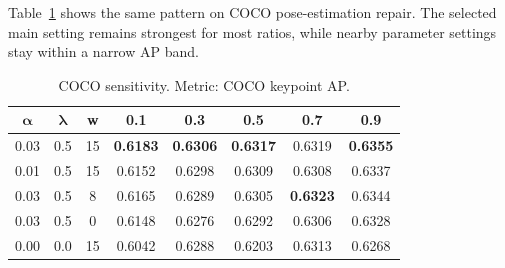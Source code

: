Table~\ref{tab:coco-rpc-sensitivity} shows the same pattern on COCO pose-estimation repair. The selected main setting remains strongest for most ratios, while nearby \model parameter settings stay within a narrow AP band.

\begin{table}[t]
\centering
\caption{COCO \model sensitivity. Metric: COCO keypoint AP.}
\label{tab:coco-rpc-sensitivity}
\small
\setlength{\tabcolsep}{4pt}
\begin{tabular}{c c c c c c c c}
\toprule
\rowcolor{sectiongray} $\boldsymbol{\alpha}$ & $\boldsymbol{\lambda}$ & \textbf{w} & \textbf{0.1} & \textbf{0.3} & \textbf{0.5} & \textbf{0.7} & \textbf{0.9} \\
\midrule
0.03 & 0.5 & 15 & \textbf{0.6183} & \textbf{0.6306} & \textbf{0.6317} & 0.6319 & \textbf{0.6355} \\
0.01 & 0.5 & 15 & 0.6152 & 0.6298 & 0.6309 & 0.6308 & 0.6337 \\
0.03 & 0.5 & 8 & 0.6165 & 0.6289 & 0.6305 & \textbf{0.6323} & 0.6344 \\
0.03 & 0.5 & 0 & 0.6148 & 0.6276 & 0.6292 & 0.6306 & 0.6328 \\
0.00 & 0.0 & 15 & 0.6042 & 0.6288 & 0.6203 & 0.6313 & 0.6268 \\
\bottomrule
\end{tabular}
\end{table}
